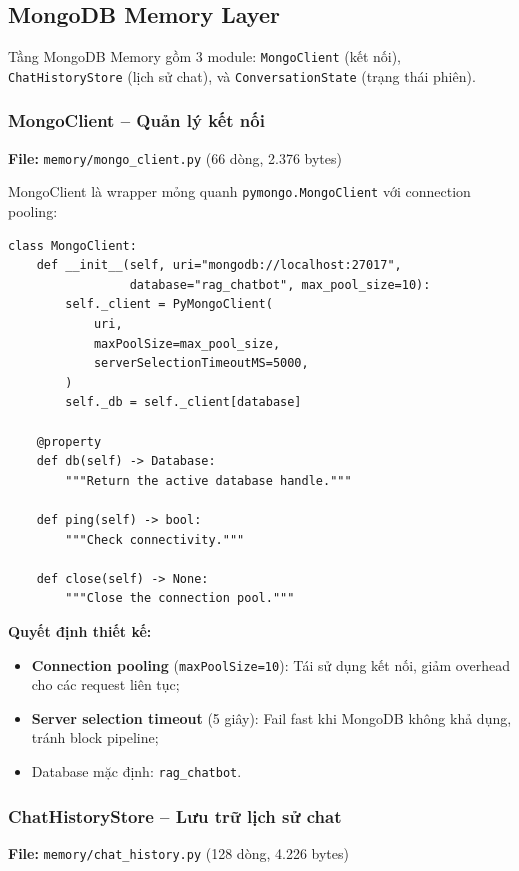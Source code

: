 \documentclass[../DoAn.tex]{subfiles}
\begin{document}
\subsection{MongoDB Memory Layer}

Tầng MongoDB Memory gồm 3 module: \texttt{MongoClient} (kết nối), \texttt{ChatHistoryStore} (lịch sử chat), và \texttt{ConversationState} (trạng thái phiên).

\subsubsection{MongoClient -- Quản lý kết nối}
\textbf{File:} \texttt{memory/mongo\_client.py} (66 dòng, 2.376 bytes)

MongoClient là wrapper mỏng quanh \texttt{pymongo.MongoClient} với connection pooling:
\begin{verbatim}
class MongoClient:
    def __init__(self, uri="mongodb://localhost:27017",
                 database="rag_chatbot", max_pool_size=10):
        self._client = PyMongoClient(
            uri,
            maxPoolSize=max_pool_size,
            serverSelectionTimeoutMS=5000,
        )
        self._db = self._client[database]

    @property
    def db(self) -> Database:
        """Return the active database handle."""

    def ping(self) -> bool:
        """Check connectivity."""

    def close(self) -> None:
        """Close the connection pool."""
\end{verbatim}

\textbf{Quyết định thiết kế:}
\begin{itemize}
    \item \textbf{Connection pooling} (\texttt{maxPoolSize=10}): Tái sử dụng kết nối, giảm overhead cho các request liên tục;
    \item \textbf{Server selection timeout} (5 giây): Fail fast khi MongoDB không khả dụng, tránh block pipeline;
    \item Database mặc định: \texttt{rag\_chatbot}.
\end{itemize}

\subsubsection{ChatHistoryStore -- Lưu trữ lịch sử chat}
\textbf{File:} \texttt{memory/chat\_history.py} (128 dòng, 4.226 bytes)
\end{document}

